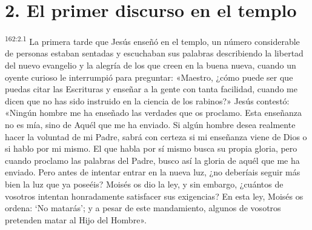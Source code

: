 \section*{2. El primer discurso en el templo}
\par 
\textsuperscript{162:2.1} La primera tarde que Jesús enseñó en el templo, un número considerable de personas estaban sentadas y escuchaban sus palabras describiendo la libertad del nuevo evangelio y la alegría de los que creen en la buena nueva, cuando un oyente curioso le interrumpió para preguntar: «Maestro, ¿cómo puede ser que puedas citar las Escrituras y enseñar a la gente con tanta facilidad, cuando me dicen que no has sido instruido en la ciencia de los rabinos?» Jesús contestó: «Ningún hombre me ha enseñado las verdades que os proclamo. Esta enseñanza no es mía, sino de Aquél que me ha enviado. Si algún hombre desea realmente hacer la voluntad de mi Padre, sabrá con certeza si mi enseñanza viene de Dios o si hablo por mi mismo. El que habla por sí mismo busca su propia gloria, pero cuando proclamo las palabras del Padre, busco así la gloria de aquél que me ha enviado. Pero antes de intentar entrar en la nueva luz, ¿no deberíais seguir más bien la luz que ya poseéis? Moisés os dio la ley, y sin embargo, ¿cuántos de vosotros intentan honradamente satisfacer sus exigencias? En esta ley, Moisés os ordena:
`No matarás'; y a pesar de este mandamiento, algunos de vosotros pretenden matar al Hijo del Hombre».

